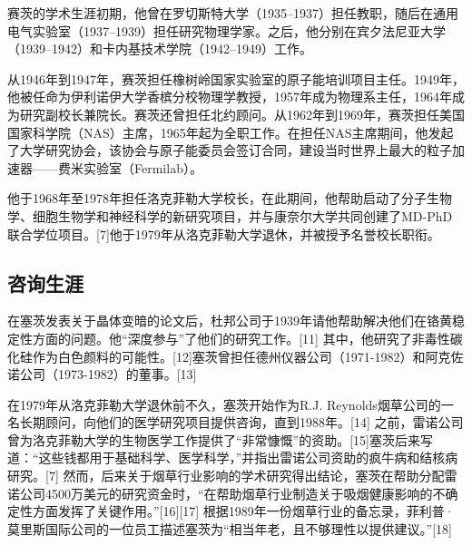 赛茨的学术生涯初期，他曾在罗切斯特大学（1935–1937）担任教职，随后在通用电气实验室（1937–1939）担任研究物理学家。之后，他分别在宾夕法尼亚大学（1939–1942）和卡内基技术学院（1942–1949）工作。

从1946年到1947年，赛茨担任橡树岭国家实验室的原子能培训项目主任。1949年，他被任命为伊利诺伊大学香槟分校物理学教授，1957年成为物理系主任，1964年成为研究副校长兼院长。赛茨还曾担任北约顾问。从1962年到1969年，赛茨担任美国国家科学院（NAS）主席，1965年起为全职工作。在担任NAS主席期间，他发起了大学研究协会，该协会与原子能委员会签订合同，建设当时世界上最大的粒子加速器——费米实验室（Fermilab）。

他于1968年至1978年担任洛克菲勒大学校长，在此期间，他帮助启动了分子生物学、细胞生物学和神经科学的新研究项目，并与康奈尔大学共同创建了MD-PhD联合学位项目。[7]他于1979年从洛克菲勒大学退休，并被授予名誉校长职衔。
\subsection{咨询生涯}  
在塞茨发表关于晶体变暗的论文后，杜邦公司于1939年请他帮助解决他们在铬黄稳定性方面的问题。他“深度参与”了他们的研究工作。[11] 其中，他研究了非毒性碳化硅作为白色颜料的可能性。[12]塞茨曾担任德州仪器公司（1971-1982）和阿克佐诺公司（1973-1982）的董事。[13]

在1979年从洛克菲勒大学退休前不久，塞茨开始作为R.J. Reynolds烟草公司的一名长期顾问，向他们的医学研究项目提供咨询，直到1988年。[14] 之前，雷诺公司曾为洛克菲勒大学的生物医学工作提供了“非常慷慨”的资助。[15]塞茨后来写道：“这些钱都用于基础科学、医学科学，”并指出雷诺公司资助的疯牛病和结核病研究。[7] 然而，后来关于烟草行业影响的学术研究得出结论，塞茨在帮助分配雷诺公司4500万美元的研究资金时，“在帮助烟草行业制造关于吸烟健康影响的不确定性方面发挥了关键作用。”[16][17] 根据1989年一份烟草行业的备忘录，菲利普·莫里斯国际公司的一位员工描述塞茨为“相当年老，且不够理性以提供建议。”[18]